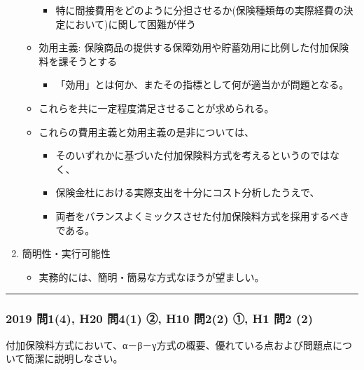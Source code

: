 \documentclass[]{article}
\begin{document}
\begin{enumerate}
\begin{itemize}
    \begin{itemize}
    \tightlist
    \item
      特に間接費用をどのように分担させるか(保険種類毎の実際経費の決定において)に関して困難が伴う
    \end{itemize}
  \item
    効用主義:
    保険商品の提供する保障効用や貯蓄効用に比例した付加保険料を課そうとする

    \begin{itemize}
    \tightlist
    \item
      「効用」とは何か、またその指標として何が適当かが問題となる。
    \end{itemize}
  \item
    これらを共に一定程度満足させることが求められる。
  \item
    これらの費用主義と効用主義の是非については、

    \begin{itemize}
    \tightlist
    \item
      そのいずれかに基づいた付加保険料方式を考えるというのではなく、
    \item
      保険金杜における実際支出を十分にコスト分析したうえで、
    \item
      両者をバランスよくミックスさせた付加保険料方式を採用するべきである。
    \end{itemize}
  \end{itemize}
\item
  簡明性・実行可能性

  \begin{itemize}
  \tightlist
  \item
    実務的には、簡明・簡易な方式なほうが望ましい。
  \end{itemize}
\end{enumerate}

\begin{center}\rule{0.5\linewidth}{0.5pt}\end{center}

\hypertarget{ux554f14-h20-ux554f41-ux2461-h10-ux554f22-ux2460-h1-ux554f2-2}{%
\subsubsection{2019 問1(4), H20 問4(1) ②, H10 問2(2) ①, H1 問2
(2)}\label{ux554f14-h20-ux554f41-ux2461-h10-ux554f22-ux2460-h1-ux554f2-2}}

付加保険料方式において、α－β－γ方式の概要、優れている点および問題点について簡潔に説明しなさい。
\end{document}
